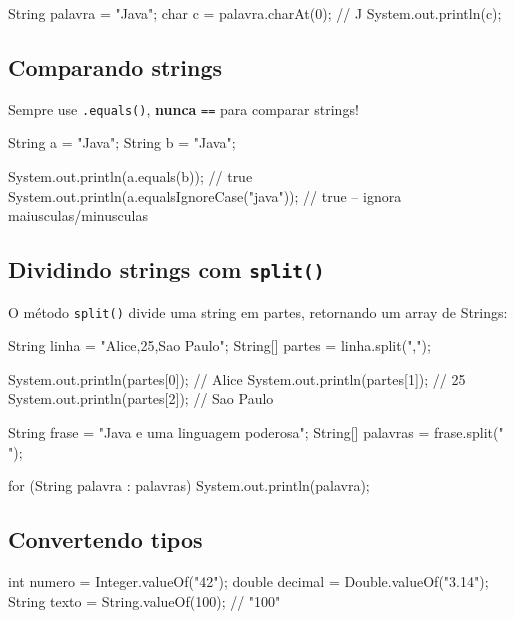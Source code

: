 \documentclass[12pt, a4paper]{article}
\newcommand{\code}[1]{\texttt{\color{javaDeep}#1}}
\begin{document}
\begin{javacode}
String palavra = "Java";
char c = palavra.charAt(0); // J
System.out.println(c);
\end{javacode}

\subsection{Comparando strings}

\begin{callout}[Atenção]
Sempre use \code{.equals()}, \textbf{nunca} \code{==} para comparar strings!
\end{callout}

\begin{javacode}
String a = "Java";
String b = "Java";

System.out.println(a.equals(b));                // true
System.out.println(a.equalsIgnoreCase("java")); // true -- ignora maiusculas/minusculas
\end{javacode}

\subsection{Dividindo strings com \texttt{split()}}

O método \code{split()} divide uma string em partes, retornando um array de Strings:

\begin{javacode}
String linha = "Alice,25,Sao Paulo";
String[] partes = linha.split(",");

System.out.println(partes[0]); // Alice
System.out.println(partes[1]); // 25
System.out.println(partes[2]); // Sao Paulo
\end{javacode}

\begin{javacode}
String frase = "Java e uma linguagem poderosa";
String[] palavras = frase.split(" ");

for (String palavra : palavras) {
    System.out.println(palavra);
}
\end{javacode}

\subsection{Convertendo tipos}

\begin{javacode}
int numero = Integer.valueOf("42");
double decimal = Double.valueOf("3.14");
String texto = String.valueOf(100); // "100"
\end{javacode}
\end{document}
